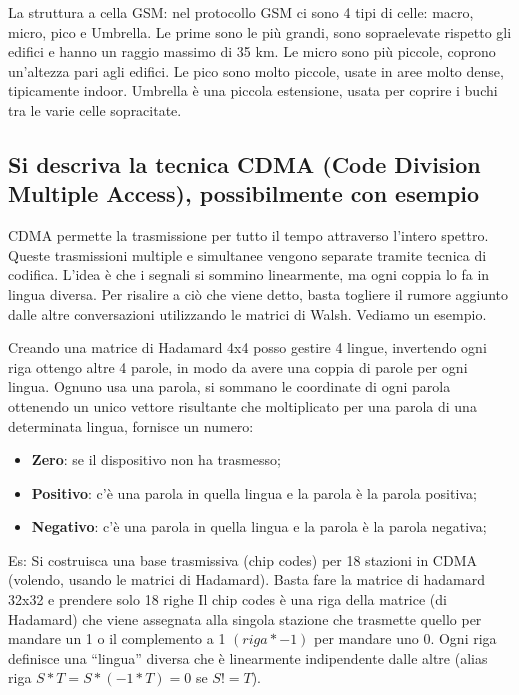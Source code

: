 La struttura a cella GSM: nel protocollo GSM ci sono 4 tipi di celle: macro, micro, pico e Umbrella.
Le prime sono le più grandi, sono sopraelevate rispetto gli edifici e hanno un raggio massimo di 35
km. Le micro sono più piccole, coprono un'altezza pari agli edifici. Le pico sono molto piccole, usate
in aree molto dense, tipicamente indoor. Umbrella è una piccola estensione, usata per coprire i
buchi tra le varie celle sopracitate.

\subsection{Si descriva la tecnica CDMA (Code Division Multiple Access), possibilmente con esempio}

CDMA permette la trasmissione per tutto il tempo attraverso l'intero spettro. Queste trasmissioni
multiple e simultanee vengono separate tramite tecnica di codifica. L'idea è che i segnali si
sommino linearmente, ma ogni coppia lo fa in lingua diversa. Per risalire a ciò che viene detto,
basta togliere il rumore aggiunto dalle altre conversazioni utilizzando le matrici di Walsh. Vediamo
un esempio.

Creando una matrice di Hadamard 4x4 posso gestire 4 lingue, invertendo ogni riga ottengo altre 4
parole, in modo da avere una coppia di parole per ogni lingua. Ognuno usa una parola, si sommano
le coordinate di ogni parola ottenendo un unico vettore risultante che moltiplicato per una parola
di una determinata lingua, fornisce un numero:

\begin{itemize}

\item \textbf{Zero}: se il dispositivo non ha trasmesso;
\item \textbf{Positivo}: c'è una parola in quella lingua e la parola è la parola positiva;
\item \textbf{Negativo}: c'è una parola in quella lingua e la parola è la parola negativa;

\end{itemize}

Es: Si costruisca una base trasmissiva (chip codes) per 18 stazioni in CDMA (volendo, usando le
matrici di Hadamard).
Basta fare la matrice di hadamard 32x32 e prendere solo 18 righe Il chip codes è una riga della
matrice (di Hadamard) che viene assegnata alla singola stazione che trasmette quello per mandare
un 1 o il complemento a 1 $(riga * -1)$ per mandare uno 0. Ogni riga definisce una ``lingua'' diversa che
è linearmente indipendente dalle altre (alias riga $S*T = S*(-1*T )= 0$ se $S != T$).

